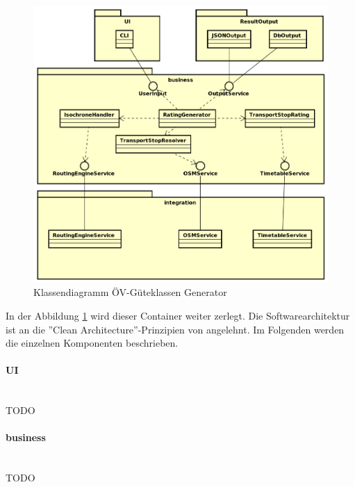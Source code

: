 \begin{figure}[ht]
    \centering
    \includegraphics[width=0.9\linewidth]{projectdoc/img/guetklassen_generator_architektur.png}
    \caption[Klassendiagramm ÖV-Güteklassen Generator]{Klassendiagramm ÖV-Güteklassen Generator}
    \label{fig:class_diagram_generator}
\end{figure}

In der Abbildung \ref{fig:class_diagram_generator} wird dieser Container weiter zerlegt.
Die Softwarearchitektur ist an die ''Clean Architecture''-Prinzipien von \cite{martin_clean_architecture} angelehnt.
Im Folgenden werden die einzelnen Komponenten beschrieben.


\paragraph{UI}~\\
TODO

\paragraph{business}~\\
TODO



